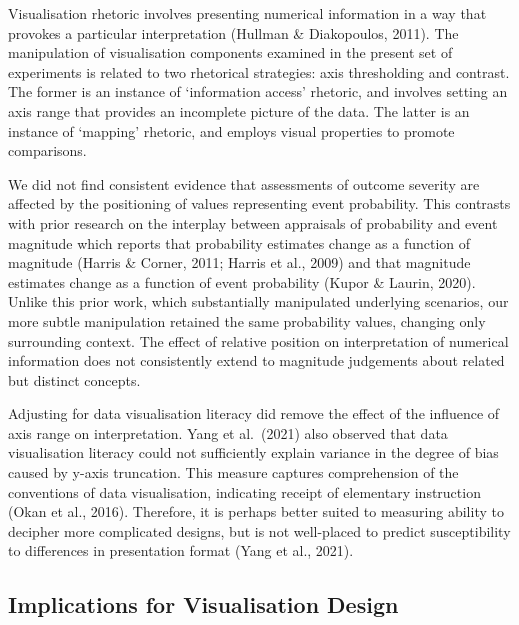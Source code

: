 \documentclass[journal]{vgtc}                %
\begin{document}
Visualisation rhetoric involves presenting numerical information in a way that provokes a particular interpretation (Hullman \& Diakopoulos, 2011). The manipulation of visualisation components examined in the present set of experiments is related to two rhetorical strategies: axis thresholding and contrast. The former is an instance of `information access' rhetoric, and involves setting an axis range that provides an incomplete picture of the data. The latter is an instance of `mapping' rhetoric, and employs visual properties to promote comparisons.

We did not find consistent evidence that assessments of outcome severity are affected by the positioning of values representing event probability. This contrasts with prior research on the interplay between appraisals of probability and event magnitude which reports that probability estimates change as a function of magnitude (Harris \& Corner, 2011; Harris et al., 2009) and that magnitude estimates change as a function of event probability (Kupor \& Laurin, 2020). Unlike this prior work, which substantially manipulated underlying scenarios, our more subtle manipulation retained the same probability values, changing only surrounding context. The effect of relative position on interpretation of numerical information does not consistently extend to magnitude judgements about related but distinct concepts.

Adjusting for data visualisation literacy did remove the effect of the influence of axis range on interpretation. Yang et al.~(2021) also observed that data visualisation literacy could not sufficiently explain variance in the degree of bias caused by y-axis truncation. This measure captures comprehension of the conventions of data visualisation, indicating receipt of elementary instruction (Okan et al., 2016). Therefore, it is perhaps better suited to measuring ability to decipher more complicated designs, but is not well-placed to predict susceptibility to differences in presentation format (Yang et al., 2021).

\hypertarget{implications-for-visualisation-design}{%
\subsection{Implications for Visualisation Design}\label{implications-for-visualisation-design}}
\end{document}
